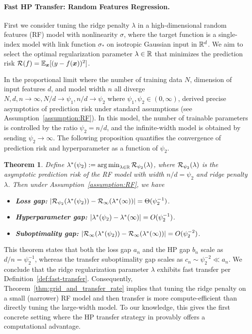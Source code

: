 \documentclass{article} %
\newtheorem{theorem}{Theorem}
\begin{document}
\paragraph{Fast HP Transfer: Random Features Regression.} First we consider tuning the ridge penalty $\lambda$ in a high-dimensional random features (RF) model with nonlinearity $\sigma$, where the target function is a single-index model with link function $\sigma_*$ on isotropic Gaussian input in $\mathbb{R}^d$. We aim to select the optimal regularization parameter $\lambda\in\mathbb{R}$ that minimizes the prediction risk $\mathcal{R}(f) = \mathbb{E}_{{\boldsymbol x}} [(y - f({\boldsymbol x}))^2]$. 

In the proportional limit where the number of training data $N$, dimension of input features $d$, and model width $n$ all diverge $N,d,n\to\infty, N/d\to\psi_1, n/d\to\psi_2$ where $\psi_1,\psi_2\in (0,\infty)$, \cite{mei2022generalization,gerace2020generalisation} derived precise asymptotics of prediction risk under standard assumptions (see Assumption~\ref{assumption:RF}). In this model, the number of trainable parameters is controlled by the ratio $\psi_2=n/d$, and the infinite-width model is obtained by sending $\psi_2\to\infty$. The following proposition quantifies the convergence of prediction risk and hyperparameter as a function of $\psi_2$. 

\begin{theorem}\label{thm:RF-rate}
Define $\lambda^*(\psi_2) := \operatorname*{arg\,min}_{\lambda\in\mathbb{R}} {\mathcal R}_{\psi_2}(\lambda)$, where ${\mathcal R}_{\psi_2}(\lambda)$ is the asymptotic prediction risk of the RF model with width $n/d=\psi_2$ and ridge penalty $\lambda$. Then under Assumption~\ref{assumption:RF}, we have
\begin{itemize}[leftmargin=*]
    \item \textbf{Loss gap:} $\abs{{\mathcal R}_{\psi_2}(\lambda^*(\psi_2)) - {\mathcal R}_{\infty}(\lambda^*(\infty))} = \Theta(\psi_2^{-1})$. 
    \item \textbf{Hyperparameter gap:} $\abs{\lambda^*(\psi_2) - \lambda^*(\infty)} = O(\psi_2^{-1})$. 
    \item \textbf{Suboptimality gap:} $\abs{{\mathcal R}_\infty(\lambda^*(\psi_2)) - {\mathcal R}_\infty(\lambda^*(\infty))} = O(\psi_2^{-2})$. 
\end{itemize}
\end{theorem}
This theorem states that both the loss gap $a_n$ and the HP gap $b_n$ scale as $d/n=\psi_2^{-1}$, whereas the transfer suboptimality gap scales as $c_n\sim \psi_2^{-2} \ll a_n$. We conclude that the ridge regularization parameter $\lambda$ exhibits fast transfer per Definition~\ref{def:fast-transfer}. Consequently, Theorem~\ref{thm:grid_and_transfer_rate} implies that tuning the ridge penalty on a small (narrower) RF model and then transfer is more compute-efficient than directly tuning the large-width model. To our knowledge, this gives the first concrete setting where the HP transfer strategy in \cite{yang2023depth} provably offers a computational advantage.   
\end{document}
